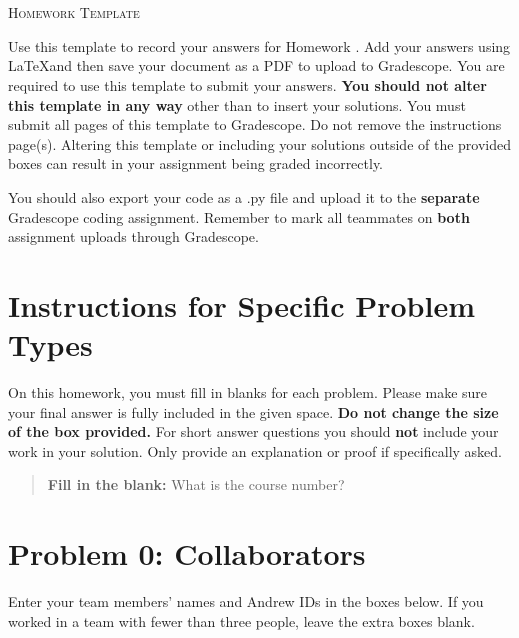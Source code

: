 \documentclass[12pt]{article}
\begin{document}
\section*{}
\begin{center}
  \centerline{\textsc{\LARGE  Homework Template}}
\end{center}

Use this template to record your answers for Homework .  Add your answers using \LaTeX and then save your document as a PDF to upload to Gradescope.  You are required to use this template to submit your answers.  \textbf{You should not alter this template in any way} other than to insert your solutions.  You must submit all \pageref{LastPage} pages of this template to Gradescope.  Do not remove the instructions page(s).  Altering this template or including your solutions outside of the provided boxes can result in your assignment being graded incorrectly.

You should also export your code as a .py file and upload it to the \textbf{separate} Gradescope coding assignment. Remember to mark all teammates on \textbf{both} assignment uploads through Gradescope.

\section*{Instructions for Specific Problem Types}

On this homework, you must fill in blanks for each problem. Please make sure your final answer is fully included in the given space.  \textbf{Do not change the size of the box provided.}  For short answer questions you should \textbf{not} include your work in your solution.  Only provide an explanation or proof if specifically asked.

\begin{quote}
\textbf{Fill in the blank:} What is the course number?

\begin{tcolorbox}[fit,height=1cm, width=4cm, blank, borderline={1pt}{-2pt},nobeforeafter]
    \begin{center} \end{center}
    \end{tcolorbox}
\end{quote}

\newpage

\section*{Problem 0: Collaborators}
Enter your team members' names and Andrew IDs in the boxes below. If you worked in a team with fewer than three people, leave the extra boxes blank.
\end{document}
